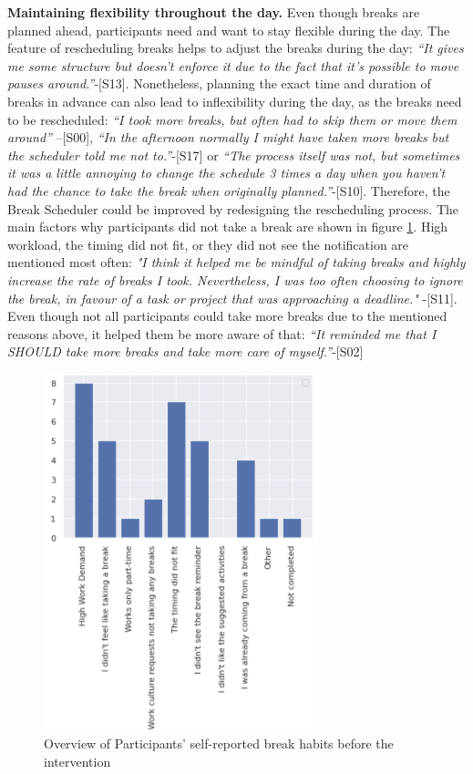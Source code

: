 \documentclass{hasel_thesis}
\begin{document}
\textbf{Maintaining flexibility throughout the day.} Even though breaks are planned ahead, participants need and want to stay flexible during the day. The feature of rescheduling breaks helps to adjust the breaks during the day: \textit{“It gives me some structure but doesn't enforce it due to the fact that it's possible to move pauses around.”}-[S13]. Nonetheless, planning the exact time and duration of breaks in advance can also lead to inflexibility during the day, as the breaks need to be rescheduled: \textit{“I took more breaks, but often had to skip them or move them around”} –[S00], \textit{“In the afternoon normally I might have taken more breaks but the scheduler told me not to.”}-[S17] or \textit{“The process itself was not, but sometimes it was a little annoying to change the schedule 3 times a day when you haven't had the chance to take the break when originally planned.”}-[S10]. Therefore, the Break Scheduler could be improved by redesigning the rescheduling process. The main factors why participants did not take a break are shown in figure \ref{fig:reasons_why_not}. High workload, the timing did not fit, or they did not see the notification are mentioned most often: \textit{"I think it helped me be mindful of taking breaks and highly increase the rate of breaks I took. Nevertheless, I was too often choosing to ignore the break, in favour of a task or project that was approaching a deadline."} -[S11]. Even though not all participants could take more breaks due to the mentioned reasons above, it helped them be more aware of that: \textit{“It reminded me that I SHOULD take more breaks and take more care of myself.”}-[S02]


\begin{figure}[htp]
    \centering
    \includegraphics[width=8cm]{hasel_thesis/images/reasons_why_not.png}
    \caption{Overview of Participants' self-reported break habits before the intervention}
    \label{fig:reasons_why_not}
\end{figure}
\end{document}
